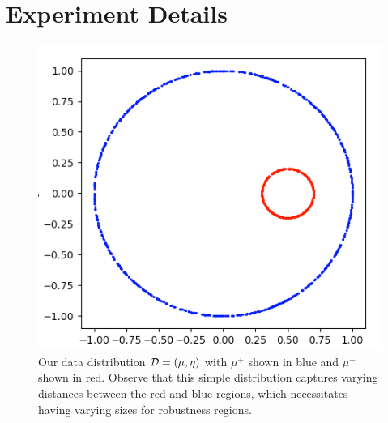 \section{Experiment Details}\label{sec:experiment_details}

\begin{figure}
    \centering
        \includegraphics[scale=0.34] {the_distribution.png}
    \caption{Our data distribution ${\mathcal D} = (\mu, \eta)$ with $\mu^+$ shown in blue and $\mu^-$ shown in red. Observe that this simple distribution captures varying distances between the red and blue regions, which necessitates having varying sizes for robustness regions. }
    \label{fig:distribution}
\end{figure}

